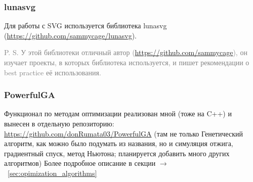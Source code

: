 \subsubsection{lunasvg}
Для работы с SVG используется библиотека lunasvg (\url{https://github.com/sammycage/lunasvg}).

\textcolor{gray}{P. S. У этой библиотеки отличный автор (\url{https://github.com/sammycage}),
он изучает проекты, в которых библиотека используется, и пишет рекомендации о best practice её использования.}

\subsubsection{PowerfulGA}
Функционал по методам оптимизации реализован мной (тоже на C++) и вынесен в отдельную репозиторию: \url{https://github.com/donRumata03/PowerfulGA}
(там не только Генетический алгоритм, как можно было подумать из названия, но и симуляция отжига, градиентный спуск, метод Ньютона;
планируется добавить много других алгоритмов)
Более подробное описание в секции $\longrightarrow$~\ref{sec:opimization_algorithms}